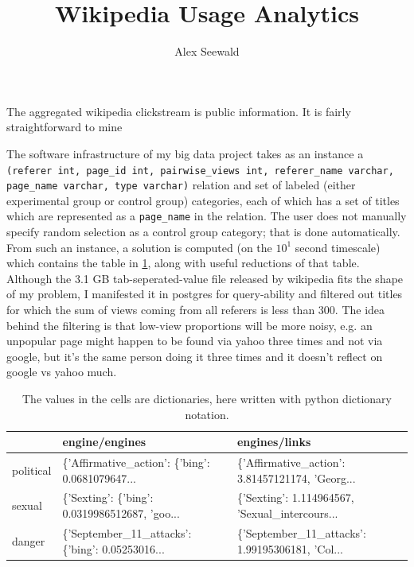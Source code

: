 \documentclass{article}
\author{Alex Seewald}
\title{Wikipedia Usage Analytics}
\begin{document}
\maketitle

The aggregated wikipedia clickstream is public information. It is fairly straightforward to mine 

The software infrastructure of my big data project takes as an instance a \texttt{(referer int, page\_id int, pairwise\_views int, referer\_name varchar, page\_name varchar, type varchar)} relation and set of labeled (either experimental group or control group) categories, each of which has a set of titles which are represented as a \texttt{page\_name} in the relation. The user does not manually specify random selection as a control group category; that is done automatically. From such an instance, a solution is computed (on the $10^1$ second timescale) which contains the table in \cref{tab:struct}, along with useful reductions of that table. Although the 3.1 GB tab-seperated-value file released by wikipedia fits the shape of my problem, I manifested it in postgres for query-ability and filtered out titles for which the sum of views coming from all referers is less than 300. The idea behind the filtering is that low-view proportions will be more noisy, e.g. an unpopular page might happen to be found via yahoo three times and not via google, but it’s the same person doing it three times and it doesn’t reflect on google vs yahoo much.

\begin{table}[H]
\begin{tabular}{lll}
\toprule
{} &                                     engine/engines &                                      engines/links \\
\midrule
political &  \{'Affirmative\_action': \{'bing': 0.0681079647... &  \{'Affirmative\_action': 3.81457121174, 'Georg... \\
sexual    &  \{'Sexting': \{'bing': 0.0319986512687, 'goo... &  \{'Sexting': 1.114964567, 'Sexual\_intercours... \\
danger    &  \{'September\_11\_attacks': \{'bing': 0.05253016... &  \{'September\_11\_attacks': 1.99195306181, 'Col... \\
\bottomrule
\end{tabular}
\caption{The values in the cells are dictionaries, here written with python dictionary notation.}
\label{tab:struct}
\end{table}
\end{document}
